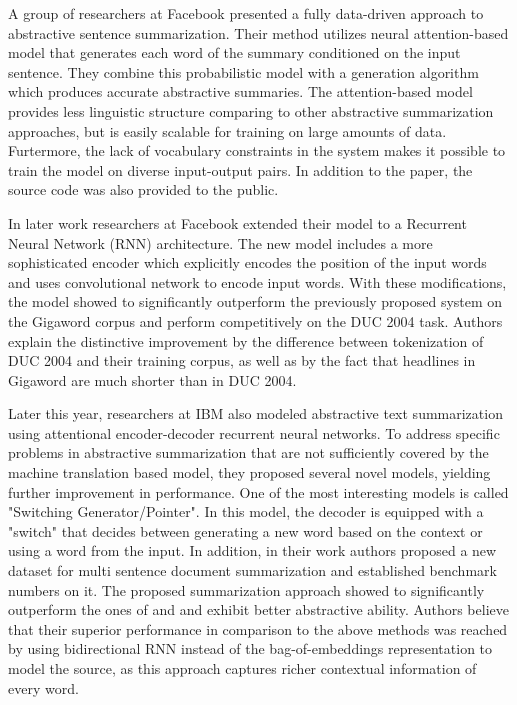 \documentclass[11pt,a4paper,onecolumn]{article}
\begin{document}
A group of researchers at Facebook \cite{rush2015neural} presented a fully data-driven approach to abstractive sentence summarization.
Their method utilizes neural attention-based model that generates each word of the summary conditioned on the input sentence.
They combine this probabilistic model with a generation algorithm which produces accurate abstractive summaries.
The attention-based model provides less linguistic structure comparing to other abstractive summarization approaches, but is easily scalable for training on large amounts of data.
Furtermore, the lack of vocabulary constraints in the system makes it possible to train the model on diverse input-output pairs.
In addition to the paper, the source code \cite{Namas2015Facebook} was also provided to the public.

In later work \cite{chopra2016abstractive} researchers at Facebook extended their model to a Recurrent Neural Network (RNN) architecture.
The new model includes a more sophisticated encoder which explicitly encodes the position of the input words and uses convolutional network to encode input words.
With these modifications, the model showed to significantly outperform the previously proposed system on the Gigaword corpus and perform competitively on the DUC 2004 task.
Authors explain the distinctive improvement by the difference between tokenization of DUC 2004 and their training corpus, as well as by the fact that headlines in Gigaword are much shorter than in DUC 2004.

Later this year, researchers at IBM \cite{nallapati2016abstractive} also modeled abstractive text summarization using attentional encoder-decoder recurrent neural networks.
To address specific problems in abstractive summarization that are not sufficiently covered by the machine translation based model, they proposed several novel models, yielding further improvement in performance.
One of the most interesting models is called "Switching Generator/Pointer". In this model, the decoder is equipped with a "switch" that decides between generating a new word based on the context or using a word from the input.
In addition, in their work authors proposed a new dataset for multi sentence document summarization and established benchmark numbers on it.
The proposed summarization approach showed to significantly outperform the ones of  and  and exhibit better abstractive ability.
Authors believe that their superior performance in comparison to the above methods was reached by using bidirectional RNN instead of the bag-of-embeddings representation to model the source, as this approach captures richer contextual information of every word.
\end{document}
